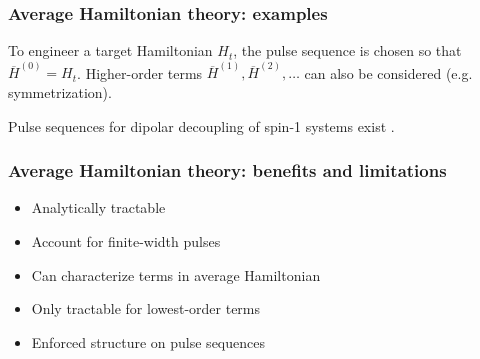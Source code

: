 \documentclass{beamer}
\begin{document}
\begin{frame}
\frametitle{Average Hamiltonian theory: examples}

To engineer a target Hamiltonian $H_t$, the pulse sequence is chosen so that $\overline{H}^{(0)} = H_t$. Higher-order terms $\overline{H}^{(1)}, \overline{H}^{(2)}, \dots$ can also be considered (e.g. symmetrization).

\begin{table}
\centering
{}
\end{table}


Pulse sequences for dipolar decoupling of spin-1 systems exist \cite{PhysRevLett.119.183603, O_Keeffe_2019}.

\end{frame}

\begin{frame}
\frametitle{Average Hamiltonian theory: benefits and limitations}

\begin{itemize}
    \item Analytically tractable
    \item Account for finite-width pulses
    \item Can characterize terms in average Hamiltonian
    \pause
    \item Only tractable for lowest-order terms
    \item Enforced structure on pulse sequences
\end{itemize}

\end{frame}
\end{document}
